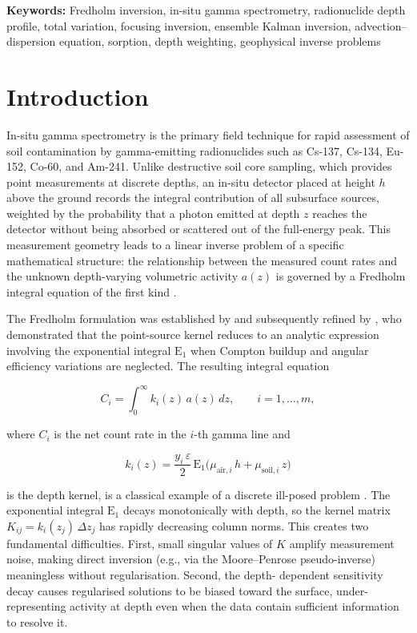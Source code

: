 \documentclass[a4paper,11pt]{article}
\newcommand{\Eone}{\mathrm{E}_1}
\begin{document}
\medskip
\noindent\textbf{Keywords:} Fredholm inversion, in-situ gamma spectrometry,
radionuclide depth profile, total variation, focusing inversion,
ensemble Kalman inversion, advection--dispersion equation, sorption,
depth weighting, geophysical inverse problems

\newpage
\section{Introduction}\label{sec:intro}

In-situ gamma spectrometry is the primary field technique for rapid
assessment of soil contamination by gamma-emitting radionuclides such as
Cs-137, Cs-134, Eu-152, Co-60, and Am-241.  Unlike destructive soil
core sampling, which provides point measurements at discrete depths, an
in-situ detector placed at height $h$ above the ground records the
integral contribution of all subsurface sources, weighted by the
probability that a photon emitted at depth $z$ reaches the detector
without being absorbed or scattered out of the full-energy peak.  This
measurement geometry leads to a linear inverse problem of a specific
mathematical structure: the relationship between the measured count rates
and the unknown depth-varying volumetric activity $a(z)$ is governed by a
Fredholm integral equation of the first kind
\citep{beck1968deconvolution,zombori1992new}.

The Fredholm formulation was established by \citet{beck1968deconvolution}
and subsequently refined by \citet{zombori1992new}, who demonstrated that
the point-source kernel reduces to an analytic expression involving the
exponential integral $\Eone$ when Compton buildup and angular efficiency
variations are neglected.  The resulting integral equation

\begin{equation}\label{eq:fredholm}
  C_i = \int_0^\infty k_i(z)\, a(z)\, dz, \qquad i = 1,\ldots, m,
\end{equation}

where $C_i$ is the net count rate in the $i$-th gamma line and

\begin{equation}\label{eq:kernel}
  k_i(z) = \frac{y_i\,\varepsilon}{2}\,\Eone\bigl(\mu_{\mathrm{air},i}\,h + \mu_{\mathrm{soil},i}\,z\bigr)
\end{equation}

is the depth kernel, is a classical example of a discrete ill-posed
problem \citep{hansen1998rank}.  The exponential integral $\Eone$ decays
monotonically with depth, so the kernel matrix $K_{ij} = k_i(z_j)\,\Delta z_j$
has rapidly decreasing column norms.  This creates two fundamental
difficulties.  First, small singular values of $K$ amplify measurement
noise, making direct inversion (e.g., via the Moore--Penrose
pseudo-inverse) meaningless without regularisation.  Second, the depth-
dependent sensitivity decay causes regularised solutions to be biased
toward the surface, under-representing activity at depth even when the
data contain sufficient information to resolve it.
\end{document}

